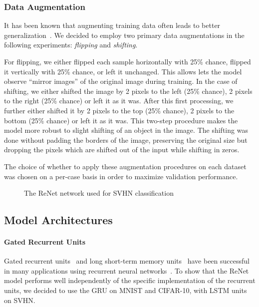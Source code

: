 \documentclass{article} \usepackage{nips15submit_e,times}
\begin{document}
\subsubsection{Data Augmentation}

It has been known that augmenting training data often leads to better
generalization~\citep[see, e.g.,][]{Krizhevsky-2012}. We decided to employ 
two primary data augmentations in the following experiments: {\it flipping} and 
{\it shifting}. 

For flipping, we either flipped each sample horizontally with 25\% chance, 
flipped it vertically with 25\% chance, or left it unchanged. This allows lets 
the model observe ``mirror images'' of the original image during training. 
In the case of shifting, we either shifted the image by 2 pixels to the left 
(25\% chance), 2 pixels to the right (25\% chance) or left it as it was. After 
this first processing, we further either shifted it by 2 pixels to the top 
(25\% chance), 2 pixels to the bottom (25\% chance) or left it as it was. This 
two-step procedure makes the model more robust to slight shifting of an object 
in the image. The shifting was done without padding the borders of the image, 
preserving the original size but dropping the pixels which are shifted out of
the input while shifting in zeros.

The choice of whether to apply these augmentation procedures on each dataset was
chosen on a per-case basis in order to maximize validation performance. 

\begin{figure}[t]
    \advance{}\columnwidth
    \centering
    \caption{The ReNet network used for SVHN classification}
    \label{fig:network}
\end{figure}

\subsection{Model Architectures}

\paragraph{Gated Recurrent Units}

Gated recurrent units~\citep[GRU,][]{Cho2014} and long short-term memory
units~\citep[LSTM,][]{Hochreiter+Schmidhuber-1997} have been successful in many
applications using recurrent neural networks~\citep[see,
e.g.,][]{Cho2014,Sutskever-et-al-NIPS2014,Xu-et-al-arxiv2015}. To show that the
ReNet model performs well independently of the
specific implementation of the recurrent units, we decided to use the GRU on 
MNIST and CIFAR-10, with LSTM units on SVHN.
\end{document}
